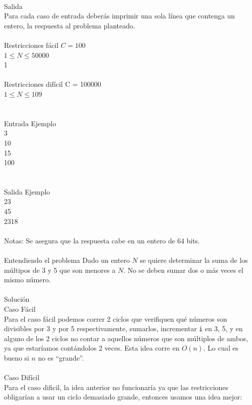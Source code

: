 \documentclass[12pt]{article}
\begin{document}
\\
\textrm{\large Salida}
\\
Para cada caso de entrada deberás imprimir una sola línea que contenga un entero, la respuesta al problema
planteado.\\
\\Restricciones fácil
$C = 100$\\
$1 ≤ N ≤ 50000$\\
1\\
\\Restricciones difícil
C = 100000\\
$1 ≤ N ≤ 109$\\
\\
\\
\textrm{\large Entrada Ejemplo}
\\
3\\
10\\
15\\
100\\
\\
\\
\textrm{\large Salida Ejemplo}
\\
23\\
45\\
2318\\
\\Notas: 
Se asegura que la respuesta cabe en un entero de 64 bits.\\
\\
\textrm{\large Entendiendo el problema}
Dado un entero $N$ se quiere determinar la suma de los múltipos de 3 y 5 que son menores a $N$. No se deben sumar dos o más veces el mismo número.\\
\\
\textrm{\large Solución}
\\
\textrm{\large Caso Fácil}\\
Para el caso fácil podemos correr 2 ciclos que verifiquen qué números son divisibles por 3 y por 5 respectivamente, sumarlos, incrementar \texttt{i} en 3, 5, y en alguno de los 2 ciclos no contar a aquellos números que son múltiplos de ambos, ya que estaríamos contándolos 2 veces. Esta idea corre en $O(n)$. Lo cual es bueno si $n$ no es ``grande''.\\
\\
\textrm{\large Caso Difícil}\\
Para el caso dificil, la idea anterior no funcionaría ya que las restricciones obligarían a usar un ciclo demasiado grande, entonces usamos una idea mejor:
\end{document}
